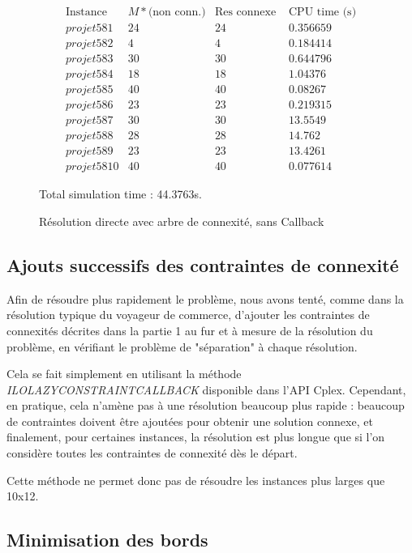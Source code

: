\documentclass[12pt,a4paper]{article}
\begin{document}
\begin{figure}
\centering
\[
\begin{array}{c|c|c|c}
\text{Instance} & M* \text{(non conn.)} & \text{Res connexe }& \text{CPU time (s)} \\\hline
projet 5 8 1 &24 & 24 & 0.356659\\ \hline
projet 5 8 2 &4 & 4 & 0.184414\\ \hline
projet 5 8 3 &30 & 30 & 0.644796\\ \hline
projet 5 8 4 &18 & 18 & 1.04376\\ \hline
projet 5 8 5 &40 & 40 & 0.08267\\ \hline
projet 5 8 6 &23 & 23 & 0.219315\\ \hline
projet 5 8 7 &30 & 30 & 13.5549\\ \hline
projet 5 8 8 &28 & 28 & 14.762\\ \hline
projet 5 8 9 &23 & 23 & 13.4261\\ \hline
projet 5 8 10 &40 & 40 & 0.077614
\end{array} \]

Total simulation time : 44.3763s.
\caption{Résolution directe avec arbre de connexité, sans Callback}
\end{figure}


\subsection{Ajouts successifs des contraintes de connexité}
Afin de résoudre plus rapidement le problème, nous avons tenté, comme dans la résolution typique du voyageur de commerce, d'ajouter les contraintes de connexités décrites dans la partie 1 au fur et à mesure de la résolution du problème, en vérifiant le problème de "séparation" à chaque résolution.

Cela se fait simplement en utilisant la méthode \textit{ILOLAZYCONSTRAINTCALLBACK} disponible dans l'API Cplex. Cependant, en pratique, cela n'amène pas à une résolution beaucoup plus rapide : beaucoup de contraintes doivent être ajoutées pour obtenir une solution connexe, et finalement, pour certaines instances, la résolution est plus longue que si l'on considère toutes les contraintes de connexité dès le départ.

Cette méthode ne permet donc pas de résoudre les instances plus larges que 10x12.

\subsection{Minimisation des bords}
\end{document}
